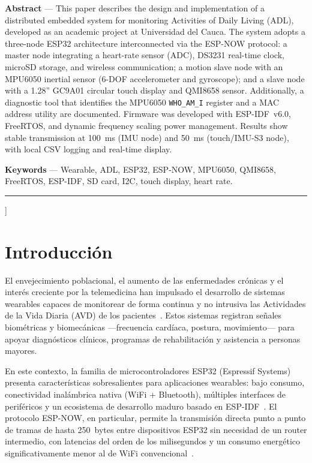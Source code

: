 \documentclass[10pt,twocolumn,a4paper]{article}
\begin{document}
{\begin{small}
\smallskip
\noindent\textbf{Abstract} — This paper describes the design and implementation
of a distributed embedded system for monitoring Activities of Daily Living (ADL),
developed as an academic project at Universidad del Cauca. The system adopts a
three-node ESP32 architecture interconnected via the ESP-NOW protocol: a master
node integrating a heart-rate sensor (ADC), DS3231 real-time clock, microSD
storage, and wireless communication; a motion slave node with an MPU6050
inertial sensor (6-DOF accelerometer and gyroscope); and a slave node with a
1.28'' GC9A01 circular touch display and QMI8658 sensor. Additionally, a
diagnostic tool that identifies the MPU6050 \texttt{WHO\_AM\_I} register and a
MAC address utility are documented. Firmware was developed with ESP-IDF~v6.0,
FreeRTOS, and dynamic frequency scaling power management. Results show stable
transmission at 100~ms (IMU node) and 50~ms (touch/IMU-S3 node), with local CSV
logging and real-time display.

\smallskip
\noindent\textbf{Keywords} — Wearable, ADL, ESP32, ESP-NOW, MPU6050, QMI8658,
FreeRTOS, ESP-IDF, SD card, I2C, touch display, heart rate.
\end{small}
\vspace{4pt}\rule{\linewidth}{0.5pt}\vspace{4pt}
}]

\section{Introducción}

El envejecimiento poblacional, el aumento de las enfermedades crónicas y
el interés creciente por la telemedicina han impulsado el desarrollo de
sistemas wearables capaces de monitorear de forma continua y no intrusiva
las Actividades de la Vida Diaria (AVD) de los pacientes~\cite{chen2012}.
Estos sistemas registran señales biométricas y biomecánicas —frecuencia
cardíaca, postura, movimiento— para apoyar diagnósticos clínicos,
programas de rehabilitación y asistencia a personas mayores.

En este contexto, la familia de microcontroladores ESP32 (Espressif
Systems) presenta características sobresalientes para aplicaciones
wearables: bajo consumo, conectividad inalámbrica nativa (WiFi +
Bluetooth), múltiples interfaces de periféricos y un ecosistema de
desarrollo maduro basado en ESP-IDF~\cite{espressif2023}. El protocolo
ESP-NOW, en particular, permite la transmisión directa punto a punto de
tramas de hasta 250~bytes entre dispositivos ESP32 sin necesidad de un
router intermedio, con latencias del orden de los milisegundos y un
consumo energético significativamente menor al de WiFi
convencional~\cite{espnow_docs}.
\end{document}
